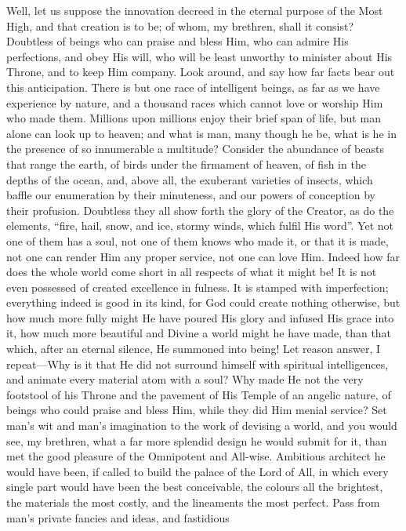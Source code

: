 Well, let us suppose the innovation decreed in the eternal purpose
of the Most High, and that creation is to be; of whom, my brethren,
shall it consist? Doubtless of beings who can praise and bless Him,
who can admire His perfections, and obey His will, who will be least
unworthy to minister about His Throne, and to keep Him company. Look
around, and say how far facts bear out this anticipation. There is but
one race of intelligent beings, as far as we have experience by
nature, and a thousand races which cannot love or worship Him who made
them. Millions upon millions enjoy their brief span of life, but man
alone can look up to heaven; and what is man, many though he be, what
is he in the presence of so innumerable a multitude? Consider the
abundance of beasts that range the earth, of birds under the firmament
of heaven, of fish in the depths of the ocean, and, above all, the
exuberant varieties of insects, which baffle our enumeration by their
minuteness, and our powers of conception by their profusion. Doubtless
they all show forth the glory of the Creator, as do the elements,
``fire, hail, snow, and ice, stormy winds, which fulfil His
word''. Yet not one of them has a soul, not one of them knows who
made it, or that it is made, not one can render Him any proper
service, not one can love Him. Indeed how far does the whole world
come short in all respects of what it might be! It is not even
possessed of created excellence in fulness. It is stamped with
imperfection; everything indeed is good in its kind, for God could
create nothing otherwise, but how much more fully might He have poured
His glory and infused His grace into it, how much more beautiful and
Divine a world might he have made, than that which, after an eternal
silence, He summoned into being! Let reason answer, I repeat—Why is
it that He did not surround himself with spiritual intelligences, and
animate every material atom with a soul? Why made He not the very
footstool of his Throne and the pavement of His Temple of an angelic
nature, of beings who could praise and bless Him, while they did Him
menial service? Set man's wit and man's imagination to the work of
devising a world, and you would see, my brethren, what a far more
splendid design he would submit for it, than met the good pleasure of
the Omnipotent and All-wise. Ambitious architect he would have been,
if called to build the palace of the Lord of All, in which every
single part would have been the best conceivable, the colours all the
brightest, the materials the most costly, and the lineaments the most
perfect. Pass from man's private fancies and ideas, and fastidious
